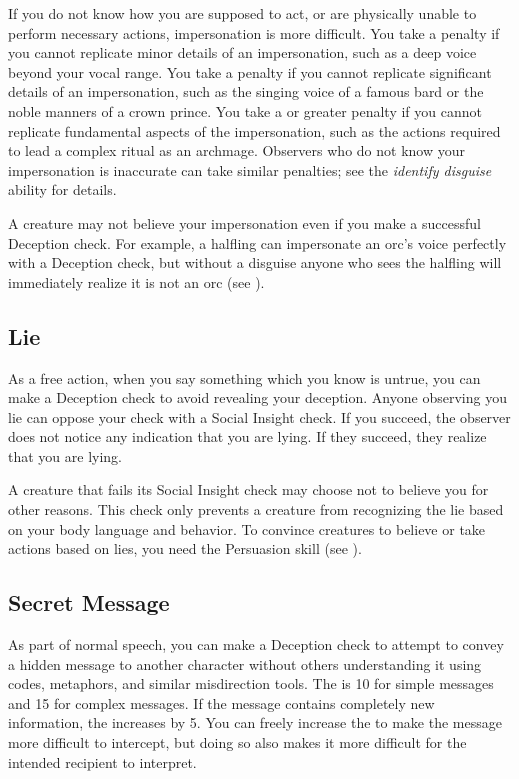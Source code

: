         If you do not know how you are supposed to act, or are physically unable to perform necessary actions, impersonation is more difficult.
        You take a  penalty if you cannot replicate minor details of an impersonation, such as a deep voice beyond your vocal range.
        You take a  penalty if you cannot replicate significant details of an impersonation, such as the singing voice of a famous bard or the noble manners of a crown prince.
        You take a  or greater penalty if you cannot replicate fundamental aspects of the impersonation, such as the actions required to lead a complex ritual as an archmage.
        Observers who do not know your impersonation is inaccurate can take similar penalties; see the \textit{identify disguise} ability for details.

        A creature may not believe your impersonation even if you make a successful Deception check.
        For example, a halfling can impersonate an orc's voice perfectly with a Deception check, but without a disguise anyone who sees the halfling will immediately realize it is not an orc (see ).

    \subsection{Lie}
        As a free action, when you say something which you know is untrue, you can make a Deception check to avoid revealing your deception.
        Anyone observing you lie can oppose your check with a Social Insight check.
        If you succeed, the observer does not notice any indication that you are lying.
        If they succeed, they realize that you are lying.

        A creature that fails its Social Insight check may choose not to believe you for other reasons.
        This check only prevents a creature from recognizing the lie based on your body language and behavior.
        To convince creatures to believe or take actions based on lies, you need the Persuasion skill (see ).

    \subsection{Secret Message}
        As part of normal speech, you can make a Deception check to attempt to convey a hidden message to another character without others understanding it using codes, metaphors, and similar misdirection tools. The  is 10 for simple messages and 15 for complex messages. If the message contains completely new information, the  increases by 5. You can freely increase the  to make the message more difficult to intercept, but doing so also makes it more difficult for the intended recipient to interpret.


